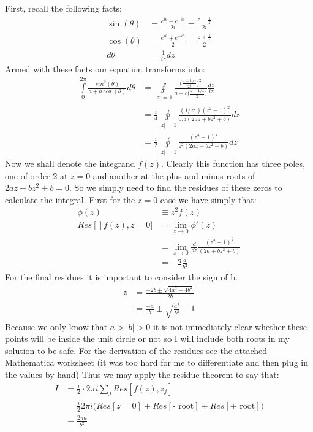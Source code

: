 \documentclass[a4paper, 11pt]{article}
\begin{document}
\noindent First, recall the following facts: 
	\begin{align*}
		\sin(\theta) &= \frac{e^{i\theta}-e^{-i\theta}}{2i} = \frac{z - \frac{1}{z}}{2i}\\
		\cos(\theta) &= \frac{e^{i\theta}+e^{-i\theta}}{2} = \frac{z+\frac{1}{z}}{2} \\ 
		d\theta &= \frac{1}{iz}dz 
	\end{align*}
Armed with these facts our equation transforms into: 
	\begin{align*}
		\int\limits_0^{2\pi}\frac{sin^2(\theta)}{a+b\cos(\theta)}d\theta &= \oint\limits_{|z|=1}\frac{\Big(\frac{z-1/z}{2i}\Big)^2}{a+b\Big(\frac{z+1/z}{2}\Big)}\frac{dz}{iz}\\ 
		&= \frac{i}{4} \oint\limits_{|z|=1} \frac{(1/z^2)(z^2-1)^2}{0.5(2az+bz^2+b)}dz \\ 
		&= \frac{i}{2} \oint\limits_{|z|=1} \frac{(z^2-1)^2}{z^2(2az+bz^2+b)}dz
	\end{align*}
Now we shall denote the integrand $f(z)$. Clearly this function has three poles, one of order 2 at $z=0$ and another at the plus and minus roots of $2az+bz^2+b=0$. So we simply need to find the residues of these zeros to calculate the integral. First for the $z=0$ case we have simply that: 
	\begin{align*}
		\phi(z) &\equiv z^2f(z) \\ 
		Res[]f(z), z=0] &= \lim\limits_{z\rightarrow 0} \phi'(z) \\
		&= \lim\limits_{z \rightarrow 0} \frac{d}{dz}\frac{(z^2-1)^2}{(2a+bz^2+b)}\\
		&=-2\frac{a}{b^2}
	\end{align*}	
For the final residues it is important to consider the sign of b. 
	\begin{align*}
		z &= \frac{-2b \pm \sqrt{4a^2-4b^2}}{2b} \\ 
		&= \frac{-a}{b} \pm \sqrt{\frac{a^2}{b^2}-1}
	\end{align*}
Because we only know that $a>|b|>0$ it is not immediately clear whether these points will be inside the unit circle or not so I will include both roots in my solution to be safe. For the derivation of the residues see the attached Mathematica worksheet (it was too hard for me to differentiate and then plug in the values by hand) Thus we may apply the residue theorem to say that: 
	\begin{align*}
		I &= \frac{i}{2}\cdot 2\pi i \sum\limits_j Res[f(z), z_j] \\
		&=\frac{i}{2} 2\pi i \Big( Res[z=0]+Res[\text{- root}]+ Res[\text{+ root}] \Big) \\ 
		&= \frac{2\pi a}{b^2}
	\end{align*}
	

	
\end{document}
